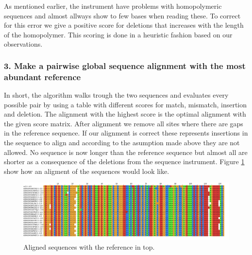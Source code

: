As mentioned earlier, the instrument have problems with homopolymeric sequences and almost allways show to few bases when reading these. To correct for this error we give a positive score for deletions that increases with the length of the homopolymer. This scoring is done in a heuristic fashion based on our observations.

\subsubsection{3. Make a pairwise global sequence alignment with the most abundant reference}

In short, the algorithm walks trough the two sequences and evaluates every possible pair by using a table with different scores for match, mismatch, insertion and deletion. The alignment with the highest score is the optimal alignment with the given score matrix. After alignment we remove all sites where there are gaps in the reference sequence. If our alignment is correct these represents insertions in the sequence to align and according to the asumption made above they are not allowed. No sequence is now longer than the reference sequence but almost all are shorter as a consequence of the deletions from the sequence instrument. Figure \ref{fig:aligned_sequences} show how an aligment of the sequences would look like.

\begin{figure}[ht]
	\centering
		\includegraphics[width=\textwidth]{../pictures/align_with_ref_cropped.png}
	\caption{Aligned sequences with the reference in top.}
	\label{fig:aligned_sequences}
\end{figure}
